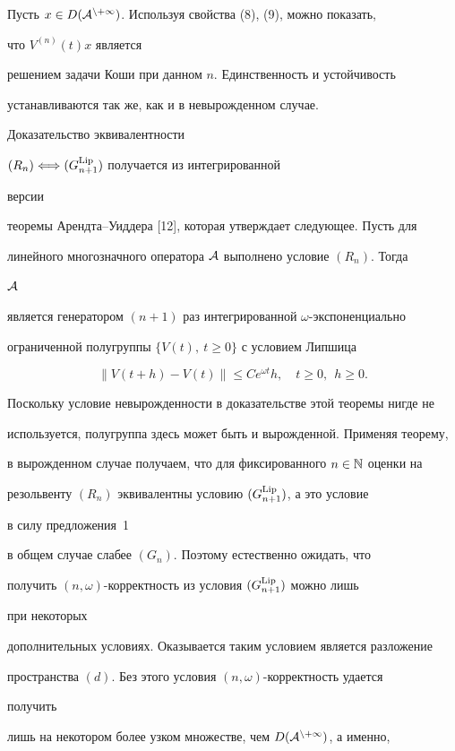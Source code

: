 Пусть $x\in D(\cal A^{n+1})$. Используя свойства (8), (9), можно показать, 


что $V^{(n)}(t)x$ является 


решением задачи Коши при данном $n$. Единственность и устойчивость 


устанавливаются так же, как и в невырожденном случае. 


 


Доказательство эквивалентности 


$(R_n)\Longleftrightarrow(G^{\operatorname{Lip}}_{n+1})$ получается из интегрированной 


версии 


теоремы Арендта--Уиддера [12], которая утверждает следующее. Пусть для 


линейного многозначного оператора $\cal A$ выполнено условие $(R_n)$. Тогда 


$\cal A$ 


является генератором $(n+1)$ раз интегрированной $\omega$-экспоненциально 


ограниченной полугруппы $\{V(t),\ t\ge0\}$ с условием Липшица 


$$ 


\|V(t+h)-V(t)\|\le C e^{\omega t}h,\quad t\ge0,\ \ h\ge0. 


$$ 


Поскольку условие невырожденности в доказательстве этой теоремы нигде не 


используется, полугруппа здесь может быть и вырожденной. Применяя теорему, 


в вырожденном случае получаем, что для фиксированного $n\in\Bbb N$ оценки на 


резольвенту $(R_n)$ эквивалентны условию $(G^{\operatorname{Lip}}_{n+1})$, а это условие 


в силу предложения~1


в общем случае слабее $(G_n)$. Поэтому естественно ожидать, что 


получить $(n,\omega)$-корректность из условия $(G^{\operatorname{Lip}}_{n+1})$ можно лишь 


при некоторых 


дополнительных условиях. Оказывается таким условием является разложение 


пространства $(d)$. Без этого условия $(n,\omega)$-корректность удается 


получить 


лишь на некотором более узком множестве, чем $D(\cal A^{n+1})$, а именно, 


